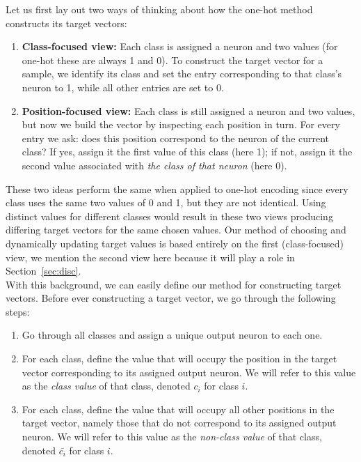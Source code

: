 \documentclass[12pt,fleqn,a4paper]{article}
\begin{document}
Let us first lay out two ways of thinking about how the one-hot method constructs its target vectors: 
\begin{enumerate}
\item \textbf{Class-focused view:} Each class is assigned a neuron and two values (for one-hot these are always 1 and 0). To construct the target vector for a sample, we identify its class and set the entry corresponding to that class's neuron to 1, while all other entries are set to 0.

\item \textbf{Position-focused view:} Each class is still assigned a neuron and two values, but now we build the vector by inspecting each position in turn. For every entry we ask: does this position correspond to the neuron of the current class? If yes, assign it the first value of this class (here 1); if not, assign it the second value associated with \textit{the class of that neuron} (here 0).

\end{enumerate}

These two ideas perform the same when applied to one-hot encoding since every class uses the same two values of 0 and 1, but they are not identical. Using distinct values for different classes would result in these two views producing differing target vectors for the same chosen values. Our method of choosing and dynamically updating target values is based entirely on the first (class-focused) view, we mention the second view here because it will play a role in Section~\ref{sec:disc}.\\

With this background, we can easily define our method for constructing target vectors. Before ever constructing a target vector, we go through the following steps:
\begin{enumerate}
    \item  Go through all classes and assign a unique output neuron to each one.
    \item For each class, define the value that will occupy the position in the target vector corresponding to its assigned output neuron. We will refer to this value as the \textit{class value} of that class, denoted $c_{i}$ for class $i$. 
    \item For each class, define the value that will occupy all other positions in the target vector, namely those that do not correspond to its assigned output neuron. We will refer to this value as the \textit{non-class value} of that class, denoted $\bar{c_{i}}$ for class $i$.
\end{enumerate}
\end{document}
